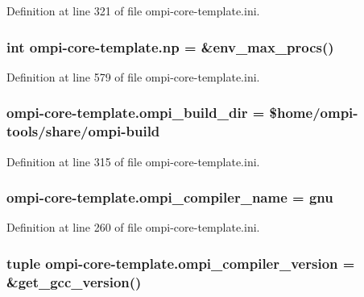 Definition at line 321 of file ompi-\/core-\/template.\-ini.

\hypertarget{namespaceompi-core-template_ac85b4df29f7ac381e1c6144e628e0027}{
\subsubsection[{np}]{\setlength{\rightskip}{0pt plus 5cm}int ompi-\/core-\/template.\-np = \&env\-\_\-max\-\_\-procs()}}\label{namespaceompi-core-template_ac85b4df29f7ac381e1c6144e628e0027}


Definition at line 579 of file ompi-\/core-\/template.\-ini.

\hypertarget{namespaceompi-core-template_a16792dcf7471cfb9371e3866e5b29bda}{
\subsubsection[{ompi\-\_\-build\-\_\-dir}]{\setlength{\rightskip}{0pt plus 5cm}ompi-\/core-\/template.\-ompi\-\_\-build\-\_\-dir = \${\bf home}/ompi-\/tools/share/ompi-\/build}}\label{namespaceompi-core-template_a16792dcf7471cfb9371e3866e5b29bda}


Definition at line 315 of file ompi-\/core-\/template.\-ini.

\hypertarget{namespaceompi-core-template_ade0d9e9efc683bbbb68edd34d616526f}{
\subsubsection[{ompi\-\_\-compiler\-\_\-name}]{\setlength{\rightskip}{0pt plus 5cm}ompi-\/core-\/template.\-ompi\-\_\-compiler\-\_\-name = gnu}}\label{namespaceompi-core-template_ade0d9e9efc683bbbb68edd34d616526f}


Definition at line 260 of file ompi-\/core-\/template.\-ini.

\hypertarget{namespaceompi-core-template_a995fd0de0a7e064a6959e6ba7e59a525}{
\subsubsection[{ompi\-\_\-compiler\-\_\-version}]{\setlength{\rightskip}{0pt plus 5cm}tuple ompi-\/core-\/template.\-ompi\-\_\-compiler\-\_\-version = \&get\-\_\-gcc\-\_\-version()}}\label{namespaceompi-core-template_a995fd0de0a7e064a6959e6ba7e59a525}


